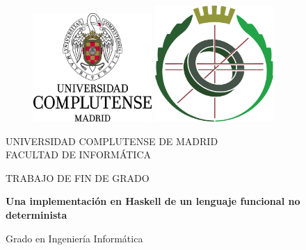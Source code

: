 \documentclass[class=article, crop=false]{standalone}
\begin{document}
\begin{titlepage}
  
  \begin{center}
    \vspace*{-1in}
    \begin{figure}[htb]
      \begin{center}
        \includegraphics[width=4.5cm]{../img/UCM.png}
        \hspace{1cm}
        \includegraphics[width=4.5cm]{../img/UCM_FDI.png}
      \end{center}
    \end{figure}
    
    UNIVERSIDAD COMPLUTENSE DE MADRID \\
    FACULTAD DE INFORMÁTICA \\
    \vspace{1.5cm}
    
    \begin{large}
      TRABAJO DE FIN DE GRADO \\
    \end{large}
    \vspace{0.5cm}
    
    \begin{Large}
      \textbf{Una implementación en Haskell de un lenguaje funcional no determinista} \\
    \end{Large}
    \vspace{0.7cm}
    
    \begin{large}
      Grado en Ingeniería Informática \\
    \end{large}
    \vspace{0.7cm}
    

\end{center}
\end{titlepage}
\end{document}
